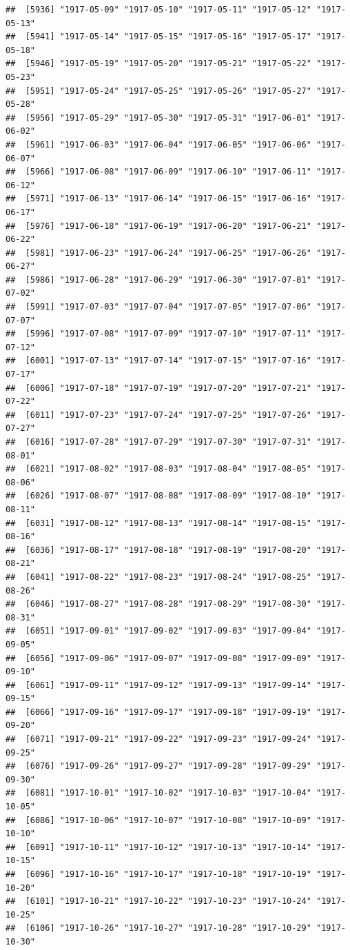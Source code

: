 \documentclass{article}\usepackage[]{graphicx}\usepackage[]{color}
\makeatletter
\newenvironment{kframe}{%
 \def\at@end@of@kframe{}%
 \ifinner\ifhmode%
  \def\at@end@of@kframe{\end{minipage}}%
  \begin{minipage}{\columnwidth}%
 \fi\fi%
 \def\FrameCommand##1{\hskip\@totalleftmargin \hskip-\fboxsep
 \colorbox{shadecolor}{##1}\hskip-\fboxsep
     \hskip-\linewidth \hskip-\@totalleftmargin \hskip\columnwidth}%
 \MakeFramed {\advance\hsize-\width
   \@totalleftmargin\z@ \linewidth\hsize
   \@setminipage}}%
 {\par\unskip\endMakeFramed%
 \at@end@of@kframe}
\newenvironment{knitrout}{}{} %
\makeatother
\begin{document}
\begin{description}
\begin{knitrout}
\begin{kframe}
\begin{verbatim}
##  [5936] "1917-05-09" "1917-05-10" "1917-05-11" "1917-05-12" "1917-05-13"
##  [5941] "1917-05-14" "1917-05-15" "1917-05-16" "1917-05-17" "1917-05-18"
##  [5946] "1917-05-19" "1917-05-20" "1917-05-21" "1917-05-22" "1917-05-23"
##  [5951] "1917-05-24" "1917-05-25" "1917-05-26" "1917-05-27" "1917-05-28"
##  [5956] "1917-05-29" "1917-05-30" "1917-05-31" "1917-06-01" "1917-06-02"
##  [5961] "1917-06-03" "1917-06-04" "1917-06-05" "1917-06-06" "1917-06-07"
##  [5966] "1917-06-08" "1917-06-09" "1917-06-10" "1917-06-11" "1917-06-12"
##  [5971] "1917-06-13" "1917-06-14" "1917-06-15" "1917-06-16" "1917-06-17"
##  [5976] "1917-06-18" "1917-06-19" "1917-06-20" "1917-06-21" "1917-06-22"
##  [5981] "1917-06-23" "1917-06-24" "1917-06-25" "1917-06-26" "1917-06-27"
##  [5986] "1917-06-28" "1917-06-29" "1917-06-30" "1917-07-01" "1917-07-02"
##  [5991] "1917-07-03" "1917-07-04" "1917-07-05" "1917-07-06" "1917-07-07"
##  [5996] "1917-07-08" "1917-07-09" "1917-07-10" "1917-07-11" "1917-07-12"
##  [6001] "1917-07-13" "1917-07-14" "1917-07-15" "1917-07-16" "1917-07-17"
##  [6006] "1917-07-18" "1917-07-19" "1917-07-20" "1917-07-21" "1917-07-22"
##  [6011] "1917-07-23" "1917-07-24" "1917-07-25" "1917-07-26" "1917-07-27"
##  [6016] "1917-07-28" "1917-07-29" "1917-07-30" "1917-07-31" "1917-08-01"
##  [6021] "1917-08-02" "1917-08-03" "1917-08-04" "1917-08-05" "1917-08-06"
##  [6026] "1917-08-07" "1917-08-08" "1917-08-09" "1917-08-10" "1917-08-11"
##  [6031] "1917-08-12" "1917-08-13" "1917-08-14" "1917-08-15" "1917-08-16"
##  [6036] "1917-08-17" "1917-08-18" "1917-08-19" "1917-08-20" "1917-08-21"
##  [6041] "1917-08-22" "1917-08-23" "1917-08-24" "1917-08-25" "1917-08-26"
##  [6046] "1917-08-27" "1917-08-28" "1917-08-29" "1917-08-30" "1917-08-31"
##  [6051] "1917-09-01" "1917-09-02" "1917-09-03" "1917-09-04" "1917-09-05"
##  [6056] "1917-09-06" "1917-09-07" "1917-09-08" "1917-09-09" "1917-09-10"
##  [6061] "1917-09-11" "1917-09-12" "1917-09-13" "1917-09-14" "1917-09-15"
##  [6066] "1917-09-16" "1917-09-17" "1917-09-18" "1917-09-19" "1917-09-20"
##  [6071] "1917-09-21" "1917-09-22" "1917-09-23" "1917-09-24" "1917-09-25"
##  [6076] "1917-09-26" "1917-09-27" "1917-09-28" "1917-09-29" "1917-09-30"
##  [6081] "1917-10-01" "1917-10-02" "1917-10-03" "1917-10-04" "1917-10-05"
##  [6086] "1917-10-06" "1917-10-07" "1917-10-08" "1917-10-09" "1917-10-10"
##  [6091] "1917-10-11" "1917-10-12" "1917-10-13" "1917-10-14" "1917-10-15"
##  [6096] "1917-10-16" "1917-10-17" "1917-10-18" "1917-10-19" "1917-10-20"
##  [6101] "1917-10-21" "1917-10-22" "1917-10-23" "1917-10-24" "1917-10-25"
##  [6106] "1917-10-26" "1917-10-27" "1917-10-28" "1917-10-29" "1917-10-30"

\end{verbatim}
\end{kframe}
\end{knitrout}
\end{description}
\end{document}
